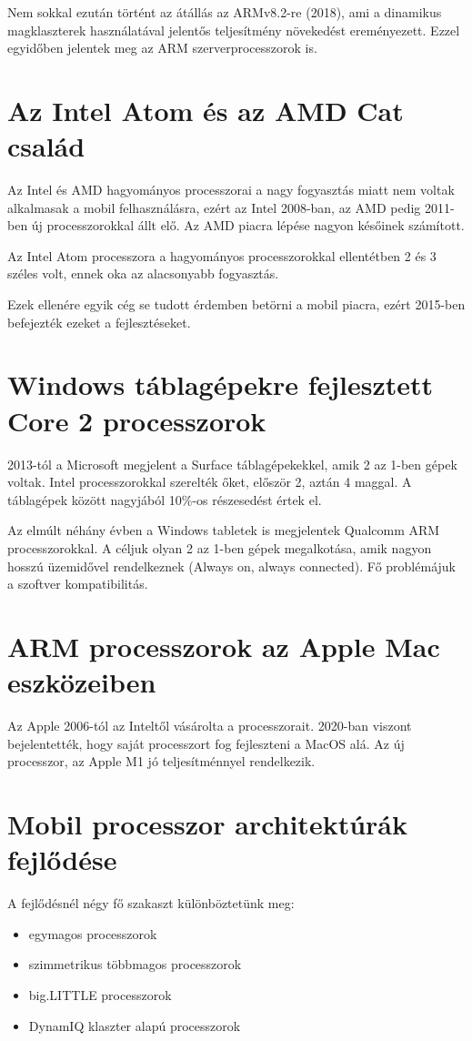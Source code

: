 Nem sokkal ezután történt az átállás az ARMv8.2-re (2018), ami a dinamikus magklaszterek használatával jelentős teljesítmény növekedést ereményezett.
Ezzel egyidőben jelentek meg az ARM szerverprocesszorok is.

\section{Az Intel Atom és az AMD Cat család}
Az Intel és AMD hagyományos processzorai a nagy fogyasztás miatt nem voltak alkalmasak a mobil felhasználásra, ezért az Intel 2008-ban, az AMD pedig 2011-ben új processzorokkal állt elő.
Az AMD piacra lépése nagyon későinek számított.

Az Intel Atom processzora a hagyományos processzorokkal ellentétben 2 és 3 széles volt, ennek oka az alacsonyabb fogyasztás.

Ezek ellenére egyik cég se tudott érdemben betörni a mobil piacra, ezért 2015-ben befejezték ezeket a fejlesztéseket.

\section{Windows táblagépekre fejlesztett Core 2 processzorok}
2013-tól a Microsoft megjelent a Surface táblagépekekkel, amik 2 az 1-ben gépek voltak.
Intel processzorokkal szerelték őket, először 2, aztán 4 maggal.
A táblagépek között nagyjából 10\%-os részesedést értek el.

Az elmúlt néhány évben a Windows tabletek is megjelentek Qualcomm ARM processzorokkal.
A céljuk olyan 2 az 1-ben gépek megalkotása, amik nagyon hosszú üzemidővel rendelkeznek (Always on, always connected).
Fő problémájuk a szoftver kompatibilitás.

\section{ARM processzorok az Apple Mac eszközeiben}
Az Apple 2006-tól az Inteltől vásárolta a processzorait.
2020-ban viszont bejelentették, hogy saját processzort fog fejleszteni a MacOS alá.
Az új processzor, az Apple M1 jó teljesítménnyel rendelkezik.

\section{Mobil processzor architektúrák fejlődése}
A fejlődésnél négy fő szakaszt különböztetünk meg:
\begin{itemize}
    \item egymagos processzorok
    \item szimmetrikus többmagos processzorok
    \item big.LITTLE processzorok
    \item DynamIQ klaszter alapú processzorok
\end{itemize}

